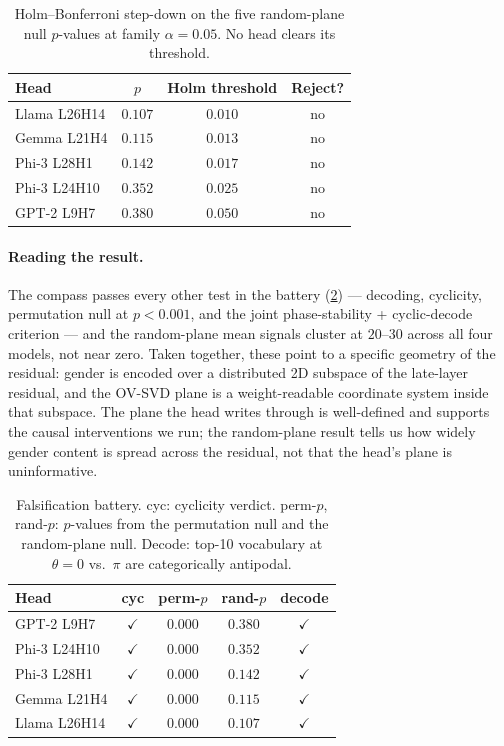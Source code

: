 \begin{table}[h]
\centering
\small
\caption{Holm--Bonferroni step-down on the five random-plane null
$p$-values at family $\alpha = 0.05$. No head clears its threshold.}
\label{tab:holm}
\begin{tabular}{lccc}
\toprule
Head & $p$ & Holm threshold & Reject? \\
\midrule
Llama L26H14   & $0.107$ & $0.010$ & no \\
Gemma L21H4    & $0.115$ & $0.013$ & no \\
Phi-3 L28H1    & $0.142$ & $0.017$ & no \\
Phi-3 L24H10   & $0.352$ & $0.025$ & no \\
GPT-2 L9H7     & $0.380$ & $0.050$ & no \\
\bottomrule
\end{tabular}
\end{table}

\paragraph{Reading the result.}
The compass passes every other test in the battery
(\cref{tab:battery}) --- decoding, cyclicity, permutation null at
$p < 0.001$, and the joint phase-stability + cyclic-decode
criterion --- and the random-plane mean signals cluster at
$20$--$30$ across all four models, not near zero. Taken together,
these point to a specific geometry of the residual: gender is
encoded over a distributed 2D subspace of the late-layer residual,
and the OV-SVD plane is a weight-readable coordinate system inside
that subspace. The plane the head writes through is well-defined
and supports the causal interventions we run; the random-plane
result tells us how widely gender content is spread across the
residual, not that the head's plane is uninformative.

\begin{table}[t]
\centering
\small
\caption{Falsification battery. cyc: cyclicity verdict. perm-$p$,
rand-$p$: $p$-values from the permutation null and the
random-plane null. Decode: top-10 vocabulary at $\theta = 0$ vs.\
$\pi$ are categorically antipodal.}
\label{tab:battery}
\begin{tabular}{lcccc}
\toprule
Head & cyc & perm-$p$ & rand-$p$ & decode \\
\midrule
GPT-2 L9H7    & $\checkmark$ & $0.000$ & $0.380$ & $\checkmark$ \\
Phi-3 L24H10  & $\checkmark$ & $0.000$ & $0.352$ & $\checkmark$ \\
Phi-3 L28H1   & $\checkmark$ & $0.000$ & $0.142$ & $\checkmark$ \\
Gemma L21H4   & $\checkmark$ & $0.000$ & $0.115$ & $\checkmark$ \\
Llama L26H14  & $\checkmark$ & $0.000$ & $0.107$ & $\checkmark$ \\
\bottomrule
\end{tabular}
\end{table}

